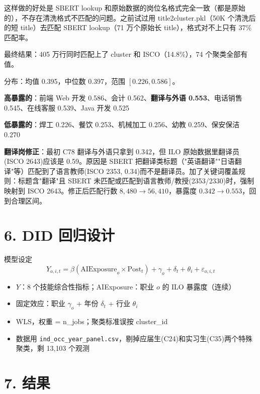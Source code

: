 \documentclass[12pt,a4paper]{article}
\begin{document}
这样做的好处是 SBERT lookup 和原始数据的岗位名格式完全一致（都是原始的），不存在清洗格式不匹配的问题。之前试过用 title2cluster.pkl（50K 个清洗后的短 title）去匹配 SBERT lookup（71 万个原始长 title），格式对不上只有 37\% 匹配率。

最终结果：405 万行同时匹配上了 cluster 和 ISCO（14.8\%），74 个聚类全部有值。

分布：均值 0.395，中位数 0.397，范围 $[0.226, 0.586]$。

\textbf{高暴露的}：前端 Web 开发 0.586、会计 0.562、\textbf{翻译与外语 0.553}、电话销售 0.545、在线客服 0.539、Java 开发 0.525

\textbf{低暴露的}：焊工 0.226、餐饮 0.253、机械加工 0.256、幼教 0.259、保安保洁 0.270

\textbf{翻译岗修正}：最初 C78 翻译与外语只拿到 0.342，但 ILO 原始数据里翻译员(ISCO 2643)应该是 0.59。原因是 SBERT 把翻译类标题（"英语翻译""日语翻译"等）匹配到了语言教师(ISCO 2353, 0.34)而不是翻译员。加了关键词覆盖规则：标题含"翻译"且 SBERT 未匹配或匹配到语言教师/教授(2353/2330)时，强制映射到 ISCO 2643。修正后匹配行数 $8{,}480 \rightarrow 56{,}410$，暴露度 $0.342 \rightarrow 0.553$，回到合理区间。

\bigskip

\section*{6. DID 回归设计}

\begin{defbox}{模型设定}
$$Y_{o,i,t} = \beta (\text{AIExposure}_o \times \text{Post}_t) + \gamma_o + \delta_t + \theta_i + \varepsilon_{o,i,t}$$

\begin{itemize}
  \item $Y$：8 个技能综合性指标；AIExposure：职业 $o$ 的 ILO 暴露度（连续）
  \item 固定效应：职业 $\gamma_o$ + 年份 $\delta_t$ + 行业 $\theta_i$
  \item WLS，权重 = n\_jobs；聚类标准误按 cluster\_id
  \item 数据用 \texttt{ind\_occ\_year\_panel.csv}，剔掉应届生(C24)和实习生(C35)两个特殊聚类，剩 13{,}103 个观测
\end{itemize}
\end{defbox}

\bigskip

\section*{7. 结果}
\end{document}
